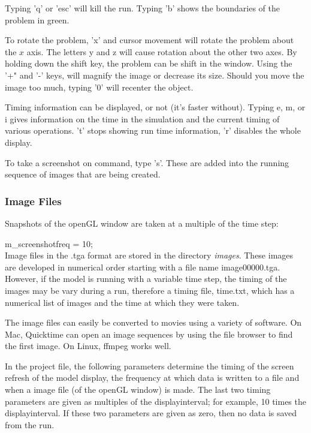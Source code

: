 \documentclass[12pt]{memoir}
\begin{document}
{{{Typing 'q' or 'esc' will kill the run. Typing 'b' shows the boundaries
of the problem in green.

To rotate the problem, 'x' and cursor movement will rotate the problem
about the $x$ axis. The letters y and z will cause rotation about the
other two axes. By holding down the shift key, the problem can be shift
in the window. Using the '+" and '-' keys, will magnify the image or
decrease its size. Should you move the image too much, typing '0' will
recenter the object.

Timing information can be displayed, or not (it's faster without).
Typing e, m, or i gives information on the time in the simulation and
the current timing of various operations. 't' stops showing run time
information, 'r' disables the whole display.

To take a screenshot on command, type 's'. These are added into the
running sequence of images that are being created.

\subsubsection{Image Files}

Snapshots of the openGL window are taken at a multiple of the time step:

m\_screenshotfreq = 10;\\ Image files in the .tga format are stored in
the directory {\em images}. These images are developed in numerical
order starting with a file name image00000.tga. However, if the model is
running with a variable time step, the timing of the images may be vary
during a run, therefore a timing file, time.txt, which has a numerical
list of images and the time at which they were taken.

The image files can easily be converted to movies using a variety of
software. On Mac, Quicktime can open an image sequences by using the
file browser to find the first image. On Linux, ffmpeg works well.


In the project file, the following parameters determine the timing of
the screen refresh of the model display, the frequency at which data is
written to a file and when a image file (of the openGL window) is made.
The last two timing parameters are given as multiples of the
displayinterval; for example, 10 times the displayinterval. If these
two parameters are given as zero, then no data is saved from the run.
\\



}}}
\end{document}
